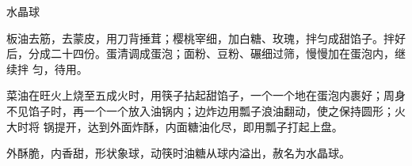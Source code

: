 \begin{recipe}{水晶球}

\ingredients


\preparation

\step 板油去筋，去蒙皮，用刀背捶茸；樱桃宰细，加白糖、玫瑰，拌匀成甜馅子。拌好
后，分成二十四份。蛋清调成蛋泡；面粉、豆粉、碾细过筛，慢慢加在蛋泡内，继续拌
匀，待用。

\step 菜油在旺火上烧至五成火时，用筷子拈起甜馅子，一个一个地在蛋泡内裹好；周身
不见馅子时，再一个一个放入油锅内；边炸边用瓢子浪油翻动，使之保持圆形；火大时将
锅提开，达到外面炸酥，内面糖油化尽，即用瓢子打起上盘。

\features

外酥脆，内香甜，形状象球，动筷时油糖从球内溢出，赦名为水晶球。

\end{recipe}

